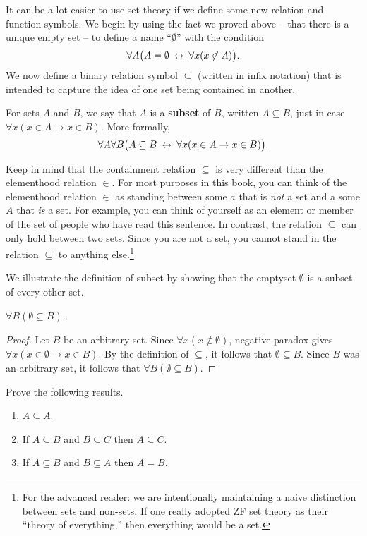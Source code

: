 It can be a lot easier to use set theory if we define some new
relation and function symbols.  We begin by using the fact we proved
above -- that there is a unique empty set -- to define a name
``$\emptyset$'' with the condition
\[ \forall A\bigl( A=\emptyset \: \leftrightarrow \: \forall x(x\not\in A) \bigr)
  .\] We now define a binary relation symbol $\subseteq$ (written in
infix notation) that is intended to capture the idea of one set being
contained in another.
\begin{defn} For sets $A$ and $B$, we say that $A$ is a \textbf{subset} of $B$,
written $A\subseteq B$, just in case $\forall x(x\in A\to x\in B)$.
More formally,
\[ \forall A\forall B\bigl( A\subseteq B \: \leftrightarrow \: \forall x(x\in
  A\to x\in B) \bigr) . \] \end{defn} Keep in mind that the
containment relation $\subseteq$ is very different than the
elementhood relation $\in$.  For most purposes in this book, you can
think of the elementhood relation $\in$ as standing between some $a$
that is {\it not} a set and a some $A$ that {\it is} a set.  For
example, you can think of yourself as an element or member of the set
of people who have read this sentence.  In contrast, the relation
$\subseteq$ can only hold between two sets.  Since you are not a set,
you cannot stand in the relation $\subseteq$ to anything
else.\footnote{For the advanced reader: we are intentionally
  maintaining a naive distinction between sets and non-sets.  If one
  really adopted ZF set theory as their ``theory of everything,'' then
  everything would be a set.}

We illustrate the definition of subset by showing that the emptyset
$\emptyset$ is a subset of every other set.

\begin{prop} $\forall B(\emptyset\subseteq B)$. \end{prop}

\begin{proof} Let $B$ be an arbitrary set.  Since
  $\forall x(x\not\in \emptyset )$, negative paradox gives
  $\forall x(x\in \emptyset\to x\in B)$.  By the definition of
  $\subseteq$, it follows that $\emptyset \subseteq B$.  Since $B$ was
  an arbitrary set, it follows that $\forall B(\emptyset\subseteq
  B)$. \end{proof}

\begin{exercises} Prove the following results.
  \begin{enumerate}
  \item $A\subseteq A$.  
  \item If $A\subseteq B$ and $B\subseteq C$ then $A\subseteq C$.
  \item If $A\subseteq B$ and $B\subseteq A$ then
    $A=B$. \end{enumerate} \end{exercises}

